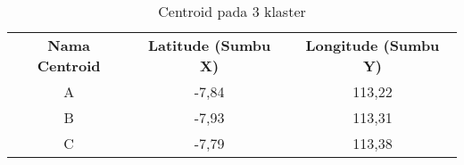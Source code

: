 \begin{table}[H]
\footnotesize
\centering
\begin{tabular}{ccc}
\rowcolor[HTML]{4472C4} 
{\color[HTML]{FFFFFF} \textbf{Nama   Centroid}} & {\color[HTML]{FFFFFF} \textbf{Latitude (Sumbu X)}} & {\color[HTML]{FFFFFF} \textbf{Longitude (Sumbu Y)}} \\
\rowcolor[HTML]{D9E1F2} 
A & -7,84 & 113,22 \\
B & -7,93 & 113,31 \\
\rowcolor[HTML]{D9E1F2} 
C & -7,79 & 113,38
\end{tabular}
\caption{Centroid pada 3 klaster}
\label{tab:center3}
\end{table}